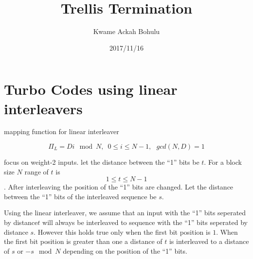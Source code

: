 \documentclass[20 pts]{article}
\title{Trellis Termination}
\author{Kwame Ackah Bohulu}
\date{2017/11/16}
\begin{document}
\maketitle

\newpage
\section{Turbo Codes using linear interleavers}
mapping function for linear interleaver

$$\Pi_L=Di \mod N,\,\,\, 0\leq i\leq N-1, \,\,\,\, gcd(N,D)=1$$

focus on weight-2 inputs. let the distance between the ``1'' bits be $t$. For a block
size $N$ range of $t$ is $$1 \leq t \leq N-1$$ . After interleaving the position of
the ``1'' bits are changed. Let the distance between the ``1'' bits of the interleaved 
sequence be $s$.

Using the linear interleaver, we assume that an input with the ``1'' bits seperated
by distance$t$ will always be interleaved to sequence with the ``1'' bits seperated by 
distance $s$. However this holds true only when the first bit position is $1$. When the
first bit position is greater than one a distance of $t$ is interleaved to a distance of $s$
or $-s \mod N$ depending on the position of the ``1'' bits.
\end{document}
